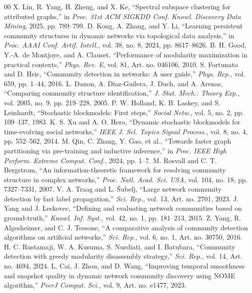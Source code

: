 \documentclass[conference]{IEEEtran}
\theoremstyle{definition}
\begin{document}
\begin{thebibliography}{00}
    X. Lin, R. Yang, H. Zheng, and X. Ke, ``Spectral subspace clustering for attributed graphs,'' in \textit{Proc. 31st ACM SIGKDD Conf. Knowl. Discovery Data Mining}, 2025, pp. 789--799.
    D. Kong, A. Zhang, and Y. Li, ``Learning persistent community structures in dynamic networks via topological data analysis,'' in \textit{Proc. AAAI Conf. Artif. Intell.}, vol. 38, no. 8, 2024, pp. 8617--8626.
    B. H. Good, Y.-A. de Montjoye, and A. Clauset, ``Performance of modularity maximization in practical contexts,'' \textit{Phys. Rev. E}, vol. 81, Art. no. 046106, 2010.
    S. Fortunato and D. Hric, ``Community detection in networks: A user guide,'' \textit{Phys. Rep.}, vol. 659, pp. 1--44, 2016.
    L. Danon, A. D{\'i}az-Guilera, J. Duch, and A. Arenas, ``Comparing community structure identification,'' \textit{J. Stat. Mech.: Theory Exp.}, vol. 2005, no. 9, pp. 219--228, 2005.
    P. W. Holland, K. B. Laskey, and S. Leinhardt, ``Stochastic blockmodels: First steps,'' \textit{Social Netw.}, vol. 5, no. 2, pp. 109--137, 1983.
    K. S. Xu and A. O. Hero, ``Dynamic stochastic blockmodels for time-evolving social networks,'' \textit{IEEE J. Sel. Topics Signal Process.}, vol. 8, no. 4, pp. 552--562, 2014.
    M. Qin, C. Zhang, Y. Gao, et al., ``Towards faster graph partitioning via pre-training and inductive inference,'' in \textit{Proc. IEEE High Perform. Extreme Comput. Conf.}, 2024, pp. 1--7.
    M. Rosvall and C. T. Bergstrom, ``An information-theoretic framework for resolving community structure in complex networks,'' \textit{Proc. Natl. Acad. Sci. USA}, vol. 104, no. 18, pp. 7327--7331, 2007.
    V. A. Traag and L. {\v S}ubelj, ``Large network community detection by fast label propagation,'' \textit{Sci. Rep.}, vol. 13, Art. no. 2701, 2023.
    J. Yang and J. Leskovec, ``Defining and evaluating network communities based on ground-truth,'' \textit{Knowl. Inf. Syst.}, vol. 42, no. 1, pp. 181--213, 2015.
    Z. Yang, R. Algesheimer, and C. J. Tessone, ``A comparative analysis of community detection algorithms on artificial networks,'' \textit{Sci. Rep.}, vol. 6, no. 1, Art. no. 30750, 2016.
    H. C. Rustamaji, W. A. Kusuma, S. Nurdiati, and I. Batubara, ``Community detection with greedy modularity disassembly strategy,'' \textit{Sci. Rep.}, vol. 14, Art. no. 4694, 2024.
    L. Cai, J. Zhou, and D. Wang, ``Improving temporal smoothness and snapshot quality in dynamic network community discovery using NOME algorithm,'' \textit{PeerJ Comput. Sci.}, vol. 9, Art. no. e1477, 2023.

\end{thebibliography}
\end{document}
